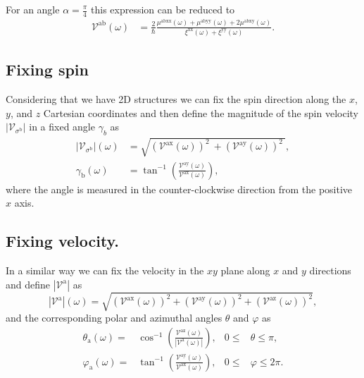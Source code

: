 \documentclass[prb,11pt,tightenlines,twocolumn,aps]{revtex4-1}
\begin{document}
For an angle $\alpha = \frac{\pi}{4}$ this expression can be reduced to 
\begin{align}
\mathcal{V}^{\mathrm{ab}} (\omega)
&= \frac{2}{\hbar}
\frac{\mu^{\mathrm{abxx}}(\omega) + \mu^{\mathrm{abyy}}(\omega) + 
2\mu^{\mathrm{abxy}}(\omega)}
{\xi^{\mathrm{xx}}(\omega) + \xi^{\mathrm{yy}}(\omega)}.
\label{eq:vab-90deg}
\end{align}




\subsection{Fixing spin}\label{sec:theory-fixspin}
Considering that we have 2D structures we can fix the spin direction along the
$x$, $y$, and $z$ Cartesian coordinates and then define the magnitude of the
spin velocity $|\mathcal{V}_{\sigma^{\mathrm{b}}}|$ in a fixed angle
$\gamma_{b}$ as
\begin{align}
|\mathcal{V}_{\sigma^{\mathrm{b}}}| (\omega)
&=
\sqrt{
(\mathcal{V}^{\mathrm{ax}}(\omega))^{2}\ +
(\mathcal{V}^{\mathrm{ay}}(\omega))^{2}\ 
}, 
\label{eq:vs-mag}
\\
\gamma_{\mathrm{b}} (\omega)
&=
\tan^{-1} \left( \frac{\mathcal{V}^{\mathrm{ay}}(\omega)}
{\mathcal{V}^{\mathrm{ax}}(\omega)} \right),
\label{eq:gamma-ang}
\end{align}
where the angle is measured in the counter-clockwise direction from the positive
$x$ axis.




\subsection{Fixing velocity.}\label{sec:theory-fixvel}

In a similar way we can fix the velocity in the $xy$ plane
along $x$ and $y$ directions and define $|\mathcal{V}^{\mathrm{a}}|$ as
\begin{equation}
|\mathcal{V}^{\mathrm{a}}| (\omega)= 
\sqrt {
(\mathcal{V}^{\mathrm{ax}}(\omega))^{2} +
(\mathcal{V}^{\mathrm{ay}}(\omega))^{2} +
(\mathcal{V}^{\mathrm{az}}(\omega))^{2} 
},
\label{eq:vv-mag}
\end{equation}
and the corresponding polar and azimuthal angles $\theta$ and $\varphi$ as
\begin{align}
\theta_{\mathrm{a}}  (\omega)
=& 
\cos^{-1} \left( \frac{\mathcal{V}^{\mathrm{az}}(\omega)}
{|\mathcal{V}^{\mathrm{a}}(\omega)|} \right),
& 0 \leq &\theta \leq \pi, 
\label{eq:polar-ang}
\\
\varphi_{\mathrm{a}} (\omega)
=& 
\tan^{-1} \left( \frac{\mathcal{V}^{\mathrm{ay}}(\omega)}
{\mathcal{V}^{\mathrm{ax}}(\omega)} \right),
& 0 \leq &\varphi \leq 2\pi.
\label{eq:azimuthal-ang} 
\end{align}
\end{document}
